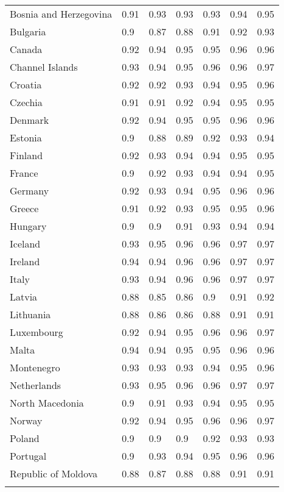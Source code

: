 \begin{longtable}[t]{lllllll}
Bosnia and Herzegovina & 0.91 & 0.93 & 0.93 & 0.93 & 0.94 & 0.95\\
Bulgaria & 0.9 & 0.87 & 0.88 & 0.91 & 0.92 & 0.93\\
\addlinespace
Canada & 0.92 & 0.94 & 0.95 & 0.95 & 0.96 & 0.96\\
Channel Islands & 0.93 & 0.94 & 0.95 & 0.96 & 0.96 & 0.97\\
Croatia & 0.92 & 0.92 & 0.93 & 0.94 & 0.95 & 0.96\\
Czechia & 0.91 & 0.91 & 0.92 & 0.94 & 0.95 & 0.95\\
Denmark & 0.92 & 0.94 & 0.95 & 0.95 & 0.96 & 0.96\\
\addlinespace
Estonia & 0.9 & 0.88 & 0.89 & 0.92 & 0.93 & 0.94\\
Finland & 0.92 & 0.93 & 0.94 & 0.94 & 0.95 & 0.95\\
France & 0.9 & 0.92 & 0.93 & 0.94 & 0.94 & 0.95\\
Germany & 0.92 & 0.93 & 0.94 & 0.95 & 0.96 & 0.96\\
Greece & 0.91 & 0.92 & 0.93 & 0.95 & 0.95 & 0.96\\
\addlinespace
Hungary & 0.9 & 0.9 & 0.91 & 0.93 & 0.94 & 0.94\\
Iceland & 0.93 & 0.95 & 0.96 & 0.96 & 0.97 & 0.97\\
Ireland & 0.94 & 0.94 & 0.96 & 0.96 & 0.97 & 0.97\\
Italy & 0.93 & 0.94 & 0.96 & 0.96 & 0.97 & 0.97\\
Latvia & 0.88 & 0.85 & 0.86 & 0.9 & 0.91 & 0.92\\
\addlinespace
Lithuania & 0.88 & 0.86 & 0.86 & 0.88 & 0.91 & 0.91\\
Luxembourg & 0.92 & 0.94 & 0.95 & 0.96 & 0.96 & 0.97\\
Malta & 0.94 & 0.94 & 0.95 & 0.95 & 0.96 & 0.96\\
Montenegro & 0.93 & 0.93 & 0.93 & 0.94 & 0.95 & 0.96\\
Netherlands & 0.93 & 0.95 & 0.96 & 0.96 & 0.97 & 0.97\\
\addlinespace
North Macedonia & 0.9 & 0.91 & 0.93 & 0.94 & 0.95 & 0.95\\
Norway & 0.92 & 0.94 & 0.95 & 0.96 & 0.96 & 0.97\\
Poland & 0.9 & 0.9 & 0.9 & 0.92 & 0.93 & 0.93\\
Portugal & 0.9 & 0.93 & 0.94 & 0.95 & 0.96 & 0.96\\
Republic of Moldova & 0.88 & 0.87 & 0.88 & 0.88 & 0.91 & 0.91\\
\addlinespace

\end{longtable}
